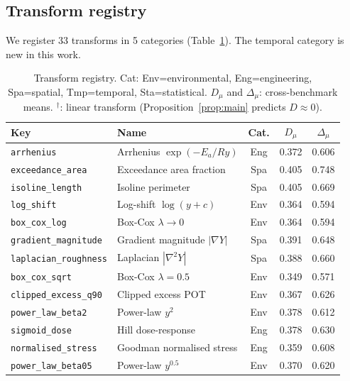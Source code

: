 \documentclass[11pt,onecolumn]{article}
\begin{document}
\subsection{Transform registry}
\label{sec:transforms}

We register 33 transforms in 5 categories (Table~\ref{tab:transforms}).
The temporal category is new in this work.

\begin{table}[H]
\centering
\caption{Transform registry. Cat: Env=environmental, Eng=engineering, Spa=spatial,
Tmp=temporal, Sta=statistical. $D_\mu$ and $\Delta_\mu$: cross-benchmark means.
${}^\dagger$: linear transform (Proposition~\ref{prop:main} predicts $D \approx 0$).}
\label{tab:transforms}
\footnotesize
\begin{tabular}{llccc}
\toprule
Key & Name & Cat. & $D_\mu$ & $\Delta_\mu$ \\
\midrule
\texttt{arrhenius}                     & Arrhenius $\exp(-E_a/Ry)$ & Eng & 0.372 & 0.606 \\
\texttt{exceedance\_area}              & Exceedance area fraction & Spa & 0.405 & 0.748 \\
\texttt{isoline\_length}               & Isoline perimeter & Spa & 0.405 & 0.669 \\
\texttt{log\_shift}                    & Log-shift $\log(y+c)$ & Env & 0.364 & 0.594 \\
\texttt{box\_cox\_log}                 & Box-Cox $\lambda\to0$ & Env & 0.364 & 0.594 \\
\texttt{gradient\_magnitude}           & Gradient magnitude $|\nabla Y|$ & Spa & 0.391 & 0.648 \\
\texttt{laplacian\_roughness}          & Laplacian $|\nabla^2 Y|$ & Spa & 0.388 & 0.660 \\
\texttt{box\_cox\_sqrt}                & Box-Cox $\lambda=0.5$ & Env & 0.349 & 0.571 \\
\texttt{clipped\_excess\_q90}          & Clipped excess POT & Env & 0.367 & 0.626 \\
\texttt{power\_law\_beta2}             & Power-law $y^2$ & Env & 0.378 & 0.612 \\
\texttt{sigmoid\_dose}                 & Hill dose-response & Eng & 0.378 & 0.630 \\
\texttt{normalised\_stress}            & Goodman normalised stress & Eng & 0.359 & 0.608 \\
\texttt{power\_law\_beta05}            & Power-law $y^{0.5}$ & Env & 0.370 & 0.620 \\

\end{tabular}
\end{table}
\end{document}
